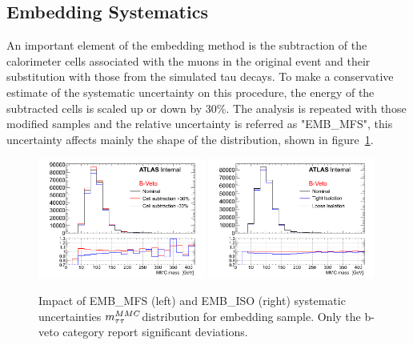 
\subsection{\Ztautau Embedding Systematics}\label{sec:embsys}

An important element of the embedding method is the subtraction of the 
calorimeter cells associated with the muons in the original \Zmumu event and their substitution with those from the simulated tau
decays. To make a conservative estimate of the systematic uncertainty on this procedure, 
the energy of the subtracted cells is scaled up or down by 30\%. The analysis is repeated with those modified 
samples and the relative uncertainty is referred as "EMB\_MFS", this uncertainty affects mainly the shape of the \mmc 
distribution, shown in figure~\ref{fig:EMBMFS}.

\begin{figure}[tp]
	\begin{center}
	\includegraphics[width=0.49\textwidth]{figure/systematics/emb_sys_NoBtagFull_MFS.png}
	\includegraphics[width=0.49\textwidth]{figure/systematics/emb_sys_NoBtagFull_Iso.png}
	\end{center}
	\caption{Impact of EMB\_MFS (left) and EMB\_ISO (right) systematic uncertainties $m_{\tau\tau}^{MMC}$distribution for embedding sample.
	Only the b-veto category report significant deviations.}
	\label{fig:EMBMFS}
\end{figure}

